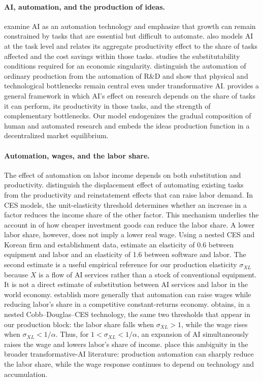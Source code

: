 \paragraph{AI, automation, and the production of ideas.}
\citet{aghionjonesjones2019} examine AI as an automation technology and emphasize that
growth can remain constrained by tasks that are essential but difficult to automate.
\citet{acemoglu2025} also models AI at the task level and relates its aggregate
productivity effect to the share of tasks affected and the cost savings within those
tasks.
\citet{nordhaus2021} studies the substitutability conditions required for an economic
singularity. \citet{trammellkorinek2023} distinguish the automation of ordinary
production from the automation of R\&D and show that physical and technological
bottlenecks remain central even under transformative AI. \citet{jones2025rd} provides
a general framework in which AI's effect on research depends on the share of tasks it
can perform, its productivity in those tasks, and the strength of complementary
bottlenecks. Our model endogenizes the gradual composition of human and automated
research and embeds the ideas production function in a decentralized market
equilibrium.

\paragraph{Automation, wages, and the labor share.}
The effect of automation on labor income depends on both substitution and
productivity. \citet{acemoglurestrepo2019} distinguish the displacement effect of
automating existing tasks from the productivity and reinstatement effects that can
raise labor demand. In CES models, the unit-elasticity threshold determines whether
an increase in a factor reduces the income share of the other factor. This mechanism
underlies the account in \citet{karabarbounisneiman2014} of how cheaper investment
goods can reduce the labor share. A lower labor share, however, does not imply a lower
real wage. Using a nested CES and Korean firm and establishment data,
\citet{aumshin2024} estimate an elasticity of 0.6 between equipment and labor and an
elasticity of 1.6 between software and labor. The second estimate is a useful
empirical reference for our production elasticity $\sigma_{XL}$ because $X$ is a flow of
AI services rather than a stock of conventional equipment. It is not a direct
estimate of substitution between AI services and labor in the world economy.
\citet{autorkausik2026} establish more generally that automation can raise
wages while reducing labor's share in a competitive constant-returns economy.
\citet{yango2026} obtains, in a nested Cobb--Douglas--CES technology, the same two
thresholds that appear in our production block: the labor share falls when
$\sigma_{XL}>1$, while the wage rises when $\sigma_{XL}<1/\alpha$. Thus, for
$1<\sigma_{XL}<1/\alpha$, an expansion of AI simultaneously raises the wage and lowers
labor's share of income. \citet{trammellkorinek2023} place this ambiguity in the
broader transformative-AI literature: production automation can sharply reduce the
labor share, while the wage response continues to depend on technology and
accumulation.

